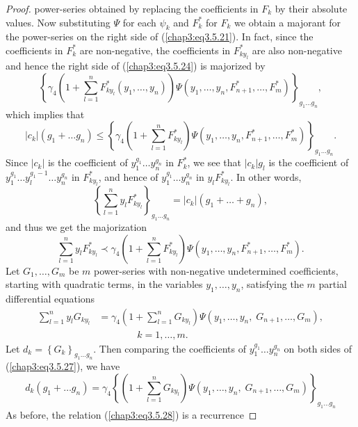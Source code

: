 \begin{proof}
power-series obtained by replacing the coefficients in $F_k$ by their
absolute values. Now substituting $\Psi$ for each $\psi_k$ and $F^*_k$
for $F_k$ we obtain a majorant for the power-series on the right side
of (\ref{chap3:eq3.5.21}). In fact, since the coefficients in $F^*_k$
are non-negative, the coefficients in $F^*_{ky_l}$ are also
non-negative and hence the right side of (\ref{chap3:eq3.5.24}) is
majorized by 
$$
\left\{ \gamma_4(1+ \sum\limits^n_{l=1} F^*_{ky_l} (y_1, \ldots, y_n))
\Psi (y_1, \ldots, y_n, F^*_{n+1}, \ldots, F^*_{m})\right\}_{g_1
  \ldots g_n},  
$$
which implies that  
$$
|c_k| (g_1+ \ldots g_n) \leq \left\{ \gamma_4 \left(1+
\sum\limits^n_{l=1} F^*_{ky_l} \right) \Psi \left(y_1, \ldots, y_n ,
F^*_{n+1}, \ldots, F^*_m \right)\right\}_{g_1 \ldots g_n}. 
$$
Since $|c_k|$ is the coefficient of $y^{g_1}_1 \ldots y^{g_n}_n$ in
$F^*_k$, we see that $|c_k| g_l$ is the coefficient of $y^{g_1}_1
\ldots y^{g_1 -1}_l \ldots y^{g_n}_n$ in $F^*_{ky_l}$, and hence of
$y^{g_1}_1 \ldots y^{g_n}_n$ in $y_l F^*_{ky_l}$. In other words,  
$$
\left\{ \sum\limits^n_{l=1} y_l F^*_{ky_l} \right\}_{g_1 \ldots g_n} =
|c_k| (g_1 + \ldots + g_n), 
$$
and thus we get the majorization
\begin{equation*}
\sum\limits^n_{l=1} y_l F^*_{ky_l} \prec \gamma_4 \left(1+
\sum\limits^n_{l=1} F^*_{ky_l} \right) \Psi (y_1, \ldots, y_n ,
F^*_{n+1}, \ldots, F^*_m). \tag{3.5.26}\label{chap3:eq3.5.26} 
\end{equation*}\pageoriginale
Let $G_1, \ldots, G_m$ be $m$ power-series with non-negative
undetermined coefficients, starting with quadratic terms, in the
variables $y_1, \ldots, y_n$, satisfying the $m$ partial differential
equations 
\begin{align*}
\sum\limits^{n}_{l=1} y_l G_{ky_l} &= \gamma_4 \left(1+
\sum\limits^n_{l=1} G_{ky_l} \right) \Psi (y_1, \ldots, y_n, \;
G_{n+1} , \ldots, G_m),\\  
&\qquad\qquad k = 1, \ldots, m. \tag{3.5.27}\label{chap3:eq3.5.27}
\end{align*}
Let $d_k = \left\{G_k \right\}_{g_1 \ldots g_n}$. Then comparing the
coefficients of $y^{g_1}_1 \ldots y^{g_n}_n$ on both sides of
(\ref{chap3:eq3.5.27}), we have 
\begin{equation*}
d_k (g_1 + \ldots g_n) = \gamma_4  \left\{(1+ \sum\limits^n_{l=1}
G_{ky_l}) \Psi (y_1, \ldots, y_n , \; G_{n+1} , \ldots, G_m)
\right\}_{g_1 \ldots g_n}\tag{3.5.28}\label{chap3:eq3.5.28} 
\end{equation*}
As before, the relation (\ref{chap3:eq3.5.28}) is a recurrence

\end{proof}
